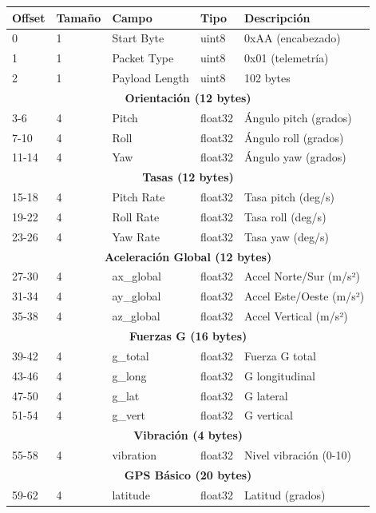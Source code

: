 \documentclass[11pt,a4paper]{article}
\begin{document}
\begin{table}[H]
\centering
\small
\begin{tabular}{@{}llllp{5cm}@{}}
\toprule
\textbf{Offset} & \textbf{Tamaño} & \textbf{Campo} & \textbf{Tipo} & \textbf{Descripción} \\
\midrule
0 & 1 & Start Byte & uint8 & 0xAA (encabezado) \\
1 & 1 & Packet Type & uint8 & 0x01 (telemetría) \\
2 & 1 & Payload Length & uint8 & 102 bytes \\
\midrule
\multicolumn{5}{c}{\textbf{Orientación (12 bytes)}} \\
\midrule
3-6 & 4 & Pitch & float32 & Ángulo pitch (grados) \\
7-10 & 4 & Roll & float32 & Ángulo roll (grados) \\
11-14 & 4 & Yaw & float32 & Ángulo yaw (grados) \\
\midrule
\multicolumn{5}{c}{\textbf{Tasas (12 bytes)}} \\
\midrule
15-18 & 4 & Pitch Rate & float32 & Tasa pitch (deg/s) \\
19-22 & 4 & Roll Rate & float32 & Tasa roll (deg/s) \\
23-26 & 4 & Yaw Rate & float32 & Tasa yaw (deg/s) \\
\midrule
\multicolumn{5}{c}{\textbf{Aceleración Global (12 bytes)}} \\
\midrule
27-30 & 4 & ax\_global & float32 & Accel Norte/Sur (m/s²) \\
31-34 & 4 & ay\_global & float32 & Accel Este/Oeste (m/s²) \\
35-38 & 4 & az\_global & float32 & Accel Vertical (m/s²) \\
\midrule
\multicolumn{5}{c}{\textbf{Fuerzas G (16 bytes)}} \\
\midrule
39-42 & 4 & g\_total & float32 & Fuerza G total \\
43-46 & 4 & g\_long & float32 & G longitudinal \\
47-50 & 4 & g\_lat & float32 & G lateral \\
51-54 & 4 & g\_vert & float32 & G vertical \\
\midrule
\multicolumn{5}{c}{\textbf{Vibración (4 bytes)}} \\
\midrule
55-58 & 4 & vibration & float32 & Nivel vibración (0-10) \\
\midrule
\multicolumn{5}{c}{\textbf{GPS Básico (20 bytes)}} \\
\midrule
59-62 & 4 & latitude & float32 & Latitud (grados) \\

\end{tabular}
\end{table}
\end{document}
